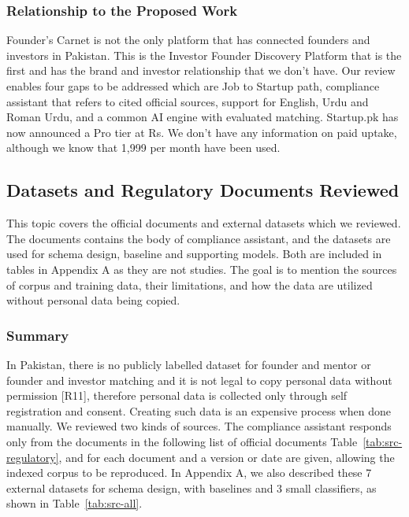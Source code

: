 \documentclass{FastFyp}
\newcommand{\src}[1]{[#1]}
\begin{document}
\subsubsection{Relationship to the Proposed Work}
Founder's Carnet is not the only platform that has connected founders and investors in Pakistan. This is the Investor Founder Discovery Platform that is the first and has the brand and investor relationship that we don't have. Our review enables four gaps to be addressed which are Job to Startup path, compliance assistant that refers to cited official sources, support for English, Urdu and Roman Urdu, and a common AI engine with evaluated matching. Startup.pk has now announced a Pro tier at Rs. We don't have any information on paid uptake, although we know that 1,999 per month \cite{ref:startuppk} have been used.

\subsection{Datasets and Regulatory Documents Reviewed}
This topic covers the official documents and external datasets which we reviewed. The documents contains the body of compliance assistant, and the datasets are used for schema design, baseline and supporting models. Both are included in tables in Appendix A as they are not studies. The goal is to mention the sources of corpus and training data, their limitations, and how the data are utilized without personal data being copied.

\subsubsection{Summary}
In Pakistan, there is no publicly labelled dataset for founder and mentor or founder and investor matching and it is not legal to copy personal data without permission \src{R11}, therefore personal data is collected only through self registration and consent. Creating such data is an expensive process when done manually. We reviewed two kinds of sources. The compliance assistant responds only from the documents in the following list of official documents Table~\ref{tab:src-regulatory}, and for each document and a version or date are given, allowing the indexed corpus to be reproduced. In Appendix A, we also described these 7 external datasets for schema design, with baselines and 3 small classifiers, as shown in Table~\ref{tab:src-all}.
\end{document}
